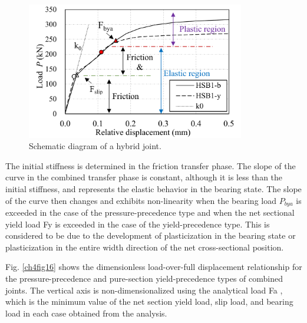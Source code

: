 \begin{figure}[htbp]
    \centering
    \includegraphics[width=0.85\textwidth]{imgs/ch4/fig15.pdf}
    \caption{Schematic diagram of a hybrid joint.}
    \label{ch4fig15}
\end{figure}

The initial stiffness is determined in the friction transfer phase. The slope of the curve in the combined transfer phase is constant, although it is less than the initial stiffness, and represents the elastic behavior in the bearing state. The slope of the curve then changes and exhibits non-linearity when the bearing load $P_{bya}$ is exceeded in the case of the pressure-precedence type and when the net sectional yield load Fy is exceeded in the case of the yield-precedence type. This is considered to be due to the development of plasticization in the bearing state or plasticization in the entire width direction of the net cross-sectional position.

Fig. \ref{ch4fig16} shows the dimensionless load-over-full displacement relationship for the pressure-precedence and pure-section yield-precedence types of combined joints. The vertical axis is non-dimensionalized using the analytical load Fa , which is the minimum value of the net section yield load, slip load, and bearing load in each case obtained from the analysis.

